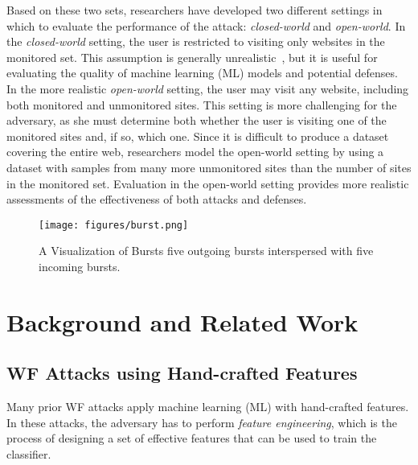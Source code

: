 \documentclass[USenglish,oneside,twocolumn]{article}
\begin{document}
Based on these two sets, researchers have developed two different settings in which to evaluate the performance of the attack:
\emph{closed-world} and \emph{open-world}. In the \emph{closed-world} setting, the user is restricted to visiting only websites in the monitored set. This assumption is generally unrealistic~\cite{Juarez2014, perry2013critique}, but it is useful for evaluating the quality of machine learning (ML) models and potential defenses. In the more realistic \emph{open-world} setting, the user may visit any website, including both monitored and unmonitored sites. This setting is more challenging for the adversary, as she must determine both whether the user is visiting one of the monitored sites and, if so, which one. Since it is difficult to produce a dataset covering the entire web, researchers model the open-world setting by using a dataset with samples from many more unmonitored sites than the number of sites in the monitored set. Evaluation in the open-world setting provides more realistic assessments of the effectiveness of both attacks and defenses.










\begin{figure}[ht!]
	\centering
    \texttt{[image: figures/burst.png]}
    \caption{A Visualization of Bursts  five outgoing bursts interspersed with five incoming bursts.}
    \label{burst}
\end{figure}

\fi
 
\section{Background and Related Work}





\subsection{WF Attacks using Hand-crafted Features}
\label{wfattack_hancrafted}

Many prior WF attacks apply machine learning (ML) with hand-crafted features. In these attacks, the adversary has to perform \emph{feature engineering}, which is the process of designing a set of effective features that can be used to train the classifier. 
\end{document}
